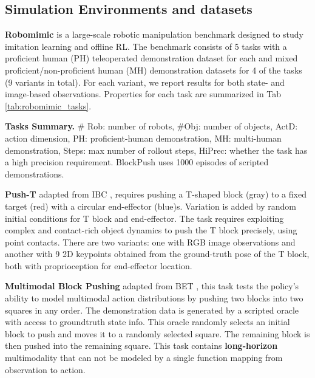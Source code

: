 \subsection{Simulation Environments and datasets}
\textbf{Robomimic}
\cite{robomimic} is a large-scale robotic manipulation benchmark designed to study imitation learning and offline RL. The benchmark consists of 5 tasks with a proficient human (PH) teleoperated demonstration dataset for each and mixed proficient/non-proficient human (MH) demonstration datasets for 4 of the tasks (9 variants in total). For each variant, we report results for both state- and image-based observations. Properties for each task are summarized in Tab \ref{tab:robomimic_tasks}.

\begin{table}
\centering

\caption{\textbf{Tasks Summary.} \# Rob: number of robots, \#Obj: number of objects, ActD: action dimension, PH: proficient-human demonstration, MH: multi-human demonstration, Steps: max number of rollout steps, HiPrec: whether the task has a high precision requirement. BlockPush uses 1000 episodes of scripted  demonstrations.}
\label{tab:robomimic_tasks}
\vspace{-5mm}
\end{table}

\textbf{Push-T}
\label{sec:eval_sim_pusht}
adapted from IBC \cite{ibc}, requires pushing a T-shaped block (gray) to a fixed target (red) with a circular end-effector (blue)s. Variation is added by random initial conditions for T block and end-effector. The task requires exploiting complex and contact-rich object dynamics to push the T block precisely, using point contacts. There are two variants: one with RGB image observations and another with 9 2D keypoints obtained from the ground-truth pose of the T block, both with proprioception for end-effector location.

\textbf{Multimodal Block Pushing} adapted from BET \cite{bet}, this task tests the policy's ability to model multimodal action distributions by pushing two blocks into two squares in any order. The demonstration data is generated by a scripted oracle with access to groundtruth state info. This oracle randomly selects an initial block to push and moves it to a randomly selected square. The remaining block is then pushed into the remaining square. This task contains \textbf{long-horizon} multimodality that can not be modeled by a single function mapping from observation to action.

